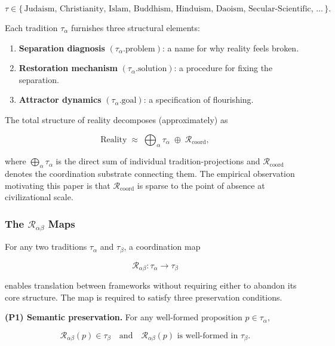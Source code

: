 \documentclass[
]{article}
\providecommand{\tightlist}{%
  \setlength{\itemsep}{0pt}\setlength{\parskip}{0pt}}
\begin{document}
\[
\tau \in \{\,\text{Judaism, Christianity, Islam, Buddhism, Hinduism, Daoism, Secular-Scientific, } \ldots\,\}.
\]

Each tradition \(\tau_\alpha\) furnishes three structural elements:

\begin{enumerate}
\def\labelenumi{\arabic{enumi}.}
\tightlist
\item
  \textbf{Separation diagnosis} \((\tau_\alpha.\text{problem})\): a name
  for why reality feels broken.
\item
  \textbf{Restoration mechanism} \((\tau_\alpha.\text{solution})\): a
  procedure for fixing the separation.
\item
  \textbf{Attractor dynamics} \((\tau_\alpha.\text{goal})\): a
  specification of flourishing.
\end{enumerate}

The total structure of reality decomposes (approximately) as

\[
\mathrm{Reality} \;\approx\; \bigoplus_\alpha \tau_\alpha \;\oplus\; \mathcal{R}_{\mathrm{coord}},
\]

where \(\bigoplus_\alpha \tau_\alpha\) is the direct sum of individual
tradition-projections and \(\mathcal{R}_{\mathrm{coord}}\) denotes the
coordination substrate connecting them. The empirical observation
motivating this paper is that \(\mathcal{R}_{\mathrm{coord}}\) is sparse
to the point of absence at civilizational scale.

\subsubsection{\texorpdfstring{The \(\mathcal{R}_{\alpha\beta}\)
Maps}{The \textbackslash mathcal\{R\}\_\{\textbackslash alpha\textbackslash beta\} Maps}}\label{the-mathcalr_alphabeta-maps-1}

For any two traditions \(\tau_\alpha\) and \(\tau_\beta\), a
coordination map

\[
\mathcal{R}_{\alpha\beta} : \tau_\alpha \longrightarrow \tau_\beta
\]

enables translation between frameworks without requiring either to
abandon its core structure. The map is required to satisfy three
preservation conditions.

\textbf{(P1) Semantic preservation.} For any well-formed proposition
\(p \in \tau_\alpha\),

\[
\mathcal{R}_{\alpha\beta}(p) \in \tau_\beta \quad \text{and} \quad \mathcal{R}_{\alpha\beta}(p) \text{ is well-formed in } \tau_\beta.
\]
\end{document}
